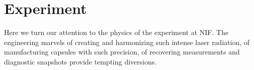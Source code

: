 \section{Experiment}

Here we turn our attention to the physics of the experiment at NIF. The engineering marvels of creating and harmonizing such intense laser radiation, of manufacturing capsules with such precision, of recovering measurements and diagnostic snapshots provide tempting diversions.

\endinput %